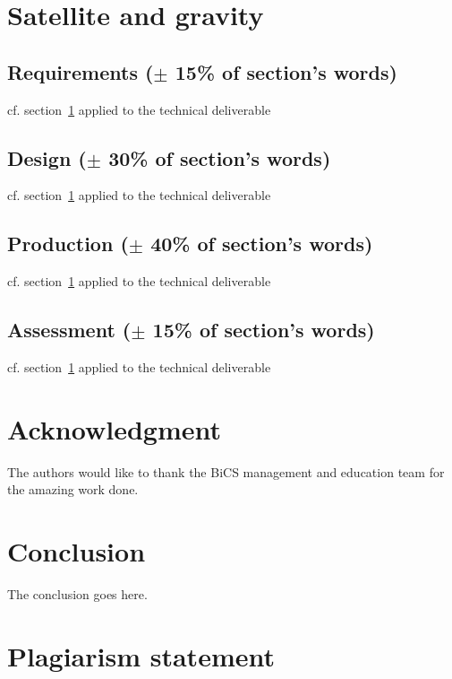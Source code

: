 \documentclass[conference,compsoc]{IEEEtran}
\begin{document}
\section{Satellite and gravity}
\label{sec-production}
\subsection{Requirements ($\pm$ 15\% of section's words)}
cf. section~\ref{sec-production} applied to the technical deliverable
\subsection{Design ($\pm$ 30\% of section's words)}
cf. section~\ref{sec-production} applied to the technical deliverable
\subsection{Production ($\pm$ 40\% of section's words)}
cf. section~\ref{sec-production} applied to the technical deliverable
\subsection{Assessment ($\pm$ 15\% of section's words)}
cf. section~\ref{sec-production} applied to the technical deliverable


\section*{Acknowledgment}
The authors would like to thank the BiCS management and education team for the amazing work done.


\section{Conclusion}
The conclusion goes here.
\section{Plagiarism statement}
\end{document}
